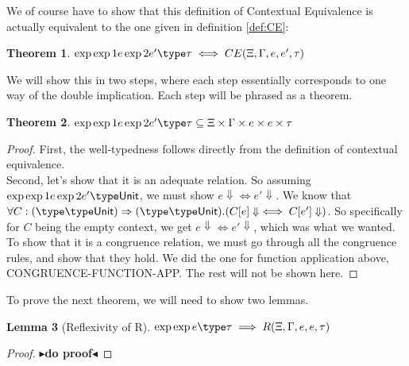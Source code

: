 \documentclass[twoside,11pt,openright]{report}
\newtheorem{theorem}{Theorem}
\newtheorem{lemma}[theorem]{Lemma}
\theoremstyle{definition}
\newcommand{\expr}{e}
\newcommand{\ctx}{C}
\newcommand{\Tunit}{\mathsf{Unit}}
\newcommand{\typ}{\tau}
\newcommand{\venv}{\Gamma}
\newcommand{\tenv}{\Xi}
\newcommand{\empvenv}{\bullet}
\newcommand{\emptenv}{\bullet}
\def\envs#1#2\exp#3\type#4{#1 \; | \; #2 \; \vdash #3 : #4}
\def\envstyp#1#2\type#3{#1 \; | \; #2 \; \vdash #3}
\def\envscteq#1#2\exp1#3\exp2#4\type#5
\newcommand{\todo}[1]{{\color[rgb]{.5,0,0}\textbf{$\blacktriangleright$#1$\blacktriangleleft$}}}
\begin{document}
We of course have to show that this definition of Contextual Equivalence is actually equivalent to the one given in definition \ref{def:CE}:
\begin{theorem}\label{thm:CE_eq}
  $\envscteq \tenv \venv \exp1 \expr \exp2 \expr' \type \typ \iff CE(\tenv, \venv, \expr, \expr', \typ)$
\end{theorem}
We will show this in two steps, where each step essentially corresponds to one way of the double implication. Each step will be phrased as a theorem.
\begin{theorem}\label{thm:CE_eq_part1}
  $\envscteq \tenv \venv \exp1 \expr \exp2 \expr' \type \typ \subseteq \tenv \times \venv \times \expr \times \expr \times \typ$\\
\end{theorem}
\begin{proof}
  First, the well-typedness follows directly from the definition of contextual equivalence.\\
  Second, let's show that it is an adequate relation. So assuming $\envscteq \empvenv \emptenv \exp1 \expr \exp2 \expr' \type \Tunit$, we must show $\expr \Downarrow \iff \expr' \Downarrow$. We know that $\forall \ctx : (\envstyp \emptenv \empvenv \type \Tunit) \Rightarrow (\envstyp {\emptenv} {\empvenv} \type \Tunit) . (\ctx[\expr] \Downarrow \iff \ctx[\expr'] \Downarrow)$. So specifically for $C$ being the empty context, we get $\expr \Downarrow \iff \expr' \Downarrow$, which was what we wanted.\\
  To show that it is a congruence relation, we must go through all the congruence rules, and show that they hold. We did the one for function application above, CONGRUENCE-FUNCTION-APP. The rest will not be shown here.
\end{proof}

To prove the next theorem, we will need to show two lemmas.
\begin{lemma}[Reflexivity of R]\label{lem:R_is_reflexive}
  $\envs \tenv \venv \exp \expr \type \typ \implies R(\tenv, \venv, \expr, \expr, \typ)$
\end{lemma}
\begin{proof}
  \todo{do proof}
\end{proof}
\end{document}
